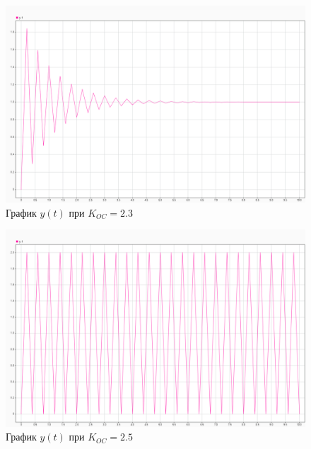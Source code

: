 \begin{figure}[H]
    \centering
\includegraphics[width=1.\linewidth,center]{assets/images/3.png}
    \caption{График $y(t)$ при $K_{OC} = 2.3$}
    \label{fig:p3}
\end{figure}


\begin{figure}[H]
    \centering
\includegraphics[width=1.\linewidth,center]{assets/images/4.png}
    \caption{График $y(t)$ при $K_{OC} = 2.5$}
    \label{fig:p4}
\end{figure}


